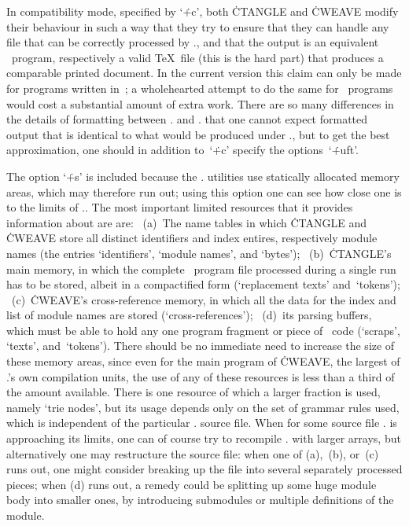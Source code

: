 In compatibility mode, specified by `\.{+c}', both \.{CTANGLE} and
\.{CWEAVE} modify their behaviour in such a way that they try to ensure that
they can handle any file that can be correctly processed by \LKC., and that
the output is an equivalent \Cee~program, respectively a valid \TeX~file
(this is the hard part) that produces a comparable printed document. In the
current version this claim can only be made for programs written in~\Cee; a
wholehearted attempt to do the same for \Cpp~programs would cost a
substantial amount of extra work. There are so many differences in the
details of formatting between \CWEBx. and \LKC. that one cannot expect
formatted output that is identical to what would be produced under \LKC.,
but to get the best approximation, one should in addition to~`\.{+c}'
specify the options~`\.{+uft}'.

The option `\.{+s}' is included because the \CWEB. utilities use statically
allocated memory areas, which may therefore run out; using this option one
can see how close one is to the limits of \CWEB.. The most important limited
resources that it provides information about are are: \ (a)~The name tables
in which \.{CTANGLE} and \.{CWEAVE} store all distinct identifiers and index
entires, respectively module names (the entries `identifiers', `module
names', and `bytes'); \ (b)~\.{CTANGLE}'s main memory, in which the complete
\Cee~program file processed during a single run has to be stored, albeit in a
compactified form (`replacement texts' and~`tokens'); \ (c)~\.{CWEAVE}'s
cross-reference memory, in which all the data for the index and list of
module names are stored (`cross-references'); \ (d)~its parsing buffers,
which must be able to hold any one program fragment or piece of
\Cee~code (`scraps', `texts', and~`tokens'). There should be no immediate
need to increase the size of these memory areas, since even for the main
program of \.{CWEAVE}, the largest of \CWEB.'s own compilation units, the
use of any of these resources is less than a third of the amount available.
There is one resource of which a larger fraction is used, namely `trie
nodes', but its usage depends only on the set of grammar rules used, which
is independent of the particular \CWEB.  source file.  When for some source
file \CWEB. is approaching its limits, one can of course try to recompile
\CWEB. with larger arrays, but alternatively one may restructure the source
file: when one of (a),~(b), or~(c) runs out, one might consider breaking up
the file into several separately processed pieces; when (d) runs out, a
remedy could be splitting up some huge module body into smaller ones, by
introducing submodules or multiple definitions of the module.

